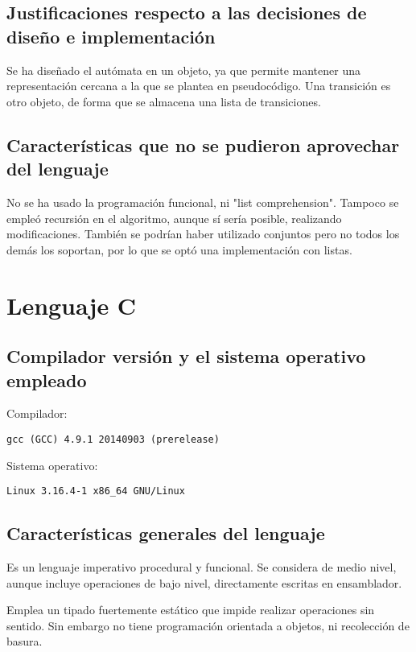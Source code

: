 \documentclass[12pt,a4paper]{article}
\begin{document}
\subsection{Justificaciones respecto a las decisiones de diseño e 
implementación}
Se ha diseñado el autómata en un objeto, ya que permite mantener una
representación cercana a la que se plantea en pseudocódigo. Una transición es 
otro objeto, de forma que se almacena una lista de transiciones.


\subsection{Características que no se pudieron aprovechar del lenguaje}
No se ha usado la programación funcional, ni "list comprehension". Tampoco se 
empleó recursión en el algoritmo, aunque sí sería posible, realizando 
modificaciones. También se podrían haber utilizado conjuntos pero no todos los 
demás los soportan, por lo que se optó una implementación con listas.




\section{Lenguaje C}

\subsection{Compilador versión y el sistema operativo empleado}
Compilador:
\begin{lstlisting}
gcc (GCC) 4.9.1 20140903 (prerelease)
\end{lstlisting}
Sistema operativo:
\begin{lstlisting}
Linux 3.16.4-1 x86_64 GNU/Linux
\end{lstlisting}


\subsection{Características generales del lenguaje}
Es un lenguaje imperativo procedural y funcional. Se considera de medio nivel,
aunque incluye operaciones de bajo nivel, directamente escritas en ensamblador.

Emplea un tipado fuertemente estático que impide realizar operaciones sin
sentido. Sin embargo no tiene programación orientada a objetos, ni recolección
de basura.
\end{document}
